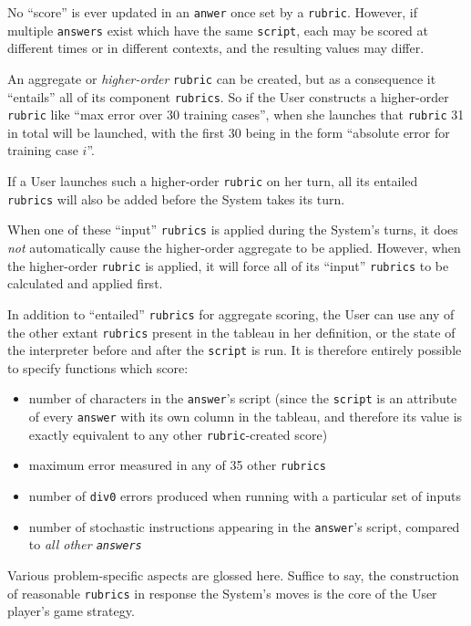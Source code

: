 No ``score'' is ever updated in an {\tt anwer} once set by a {\tt rubric}. However, if multiple {\tt answers} exist which have the same {\tt script}, each may be scored at different times or in different contexts, and the resulting values may differ.

An aggregate or \emph{higher-order} {\tt rubric} can be created, but as a consequence it ``entails'' all of its component {\tt rubrics}. So if the User constructs a higher-order {\tt rubric} like ``max error over 30 training cases'', when she launches that {\tt rubric} 31 in total will be launched, with the first 30 being in the form ``absolute error for training case $i$''.

If a User launches such a higher-order {\tt rubric} on her turn, all its entailed {\tt rubrics} will also be added before the System takes its turn.

When one of these ``input'' {\tt rubrics} is applied during the System's turns, it does \emph{not} automatically cause the higher-order aggregate to be applied. However, when the higher-order {\tt rubric} is applied, it will force all of its ``input'' {\tt rubrics} to be calculated and applied first.

In addition to ``entailed'' {\tt rubrics} for aggregate scoring, the User can use any of the other extant {\tt rubrics} present in the tableau in her definition, or the state of the interpreter before and after the {\tt script} is run. It is therefore entirely possible to specify functions which score:

\begin{itemize}
\item number of characters in the {\tt answer}'s script (since the {\tt script} is an attribute of every {\tt answer} with its own column in the tableau, and therefore its value is exactly equivalent to any other {\tt rubric}-created score)
\item maximum error measured in any of 35 other {\tt rubrics}
\item number of {\tt div0} errors produced when running with a particular set of inputs
\item number of stochastic instructions appearing in the {\tt answer}'s script, compared to \emph{all other {\tt answers}}
\end{itemize}

Various problem-specific aspects are glossed here. Suffice to say, the construction of reasonable {\tt rubrics} in response the System's moves is the core of the User player's game strategy.

